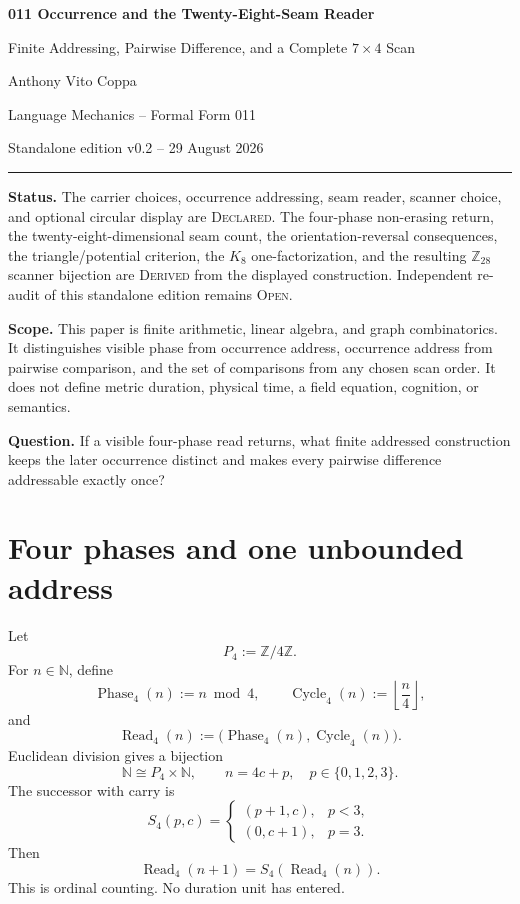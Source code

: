 \documentclass[11pt]{article}
\theoremstyle{definition}
\newcommand{\Z}{\mathbb Z}
\newcommand{\N}{\mathbb N}
\begin{document}
\thispagestyle{first}

\begin{center}
{\Large\bfseries 011 Occurrence and the Twenty-Eight-Seam Reader}\par
\vspace{0.08in}
{\large Finite Addressing, Pairwise Difference, and a Complete $7\times4$ Scan}\par
\vspace{0.16in}
{Anthony Vito Coppa}\par
\vspace{0.05in}
{\small Language Mechanics -- Formal Form 011}\par
{\small Standalone edition v0.2 -- 29 August 2026}\par
\end{center}
\vspace{0.08in}
\hrule
\vspace{0.12in}

\textbf{Status.} The carrier choices, occurrence addressing, seam reader, scanner choice, and optional circular display are \textsc{Declared}. The four-phase non-erasing return, the twenty-eight-dimensional seam count, the orientation-reversal consequences, the triangle/potential criterion, the $K_8$ one-factorization, and the resulting $\Z_{28}$ scanner bijection are \textsc{Derived} from the displayed construction. Independent re-audit of this standalone edition remains \textsc{Open}.

\textbf{Scope.} This paper is finite arithmetic, linear algebra, and graph combinatorics. It distinguishes visible phase from occurrence address, occurrence address from pairwise comparison, and the set of comparisons from any chosen scan order. It does not define metric duration, physical time, a field equation, cognition, or semantics.

\textbf{Question.} If a visible four-phase read returns, what finite addressed construction keeps the later occurrence distinct and makes every pairwise difference addressable exactly once?

\section{Four phases and one unbounded address}
Let
\[
P_4:=\Z/4\Z.
\]
For $n\in\N$, define
\[
\operatorname{Phase}_4(n):=n\bmod4,
\qquad
\operatorname{Cycle}_4(n):=\left\lfloor\frac n4\right\rfloor,
\]
and
\[
\operatorname{Read}_4(n):=\bigl(\operatorname{Phase}_4(n),\operatorname{Cycle}_4(n)\bigr).
\]
Euclidean division gives a bijection
\[
\boxed{\N\cong P_4\times\N},
\qquad
n=4c+p,
\quad p\in\{0,1,2,3\}.
\]
The successor with carry is
\[
S_4(p,c)=
\begin{cases}
(p+1,c),&p<3,\\
(0,c+1),&p=3.
\end{cases}
\]
Then
\[
\operatorname{Read}_4(n+1)=S_4(\operatorname{Read}_4(n)).
\]
This is ordinal counting. No duration unit has entered.
\end{document}

